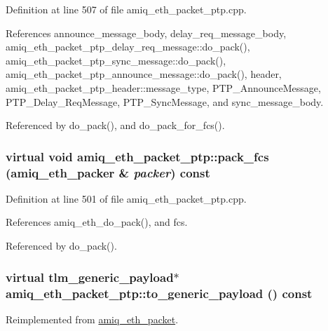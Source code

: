 Definition at line 507 of file amiq\_\-eth\_\-packet\_\-ptp.cpp.

References announce\_\-message\_\-body, delay\_\-req\_\-message\_\-body, amiq\_\-eth\_\-packet\_\-ptp\_\-delay\_\-req\_\-message::do\_\-pack(), amiq\_\-eth\_\-packet\_\-ptp\_\-sync\_\-message::do\_\-pack(), amiq\_\-eth\_\-packet\_\-ptp\_\-announce\_\-message::do\_\-pack(), header, amiq\_\-eth\_\-packet\_\-ptp\_\-header::message\_\-type, PTP\_\-AnnounceMessage, PTP\_\-Delay\_\-ReqMessage, PTP\_\-SyncMessage, and sync\_\-message\_\-body.

Referenced by do\_\-pack(), and do\_\-pack\_\-for\_\-fcs().\hypertarget{classamiq__eth__packet__ptp_ab7bc36daf8f06a4c65e4cbe4c84a04a7}{
\subsubsection[{pack\_\-fcs}]{\setlength{\rightskip}{0pt plus 5cm}virtual void amiq\_\-eth\_\-packet\_\-ptp::pack\_\-fcs ({\bf amiq\_\-eth\_\-packer} \& {\em packer}) const}}
\label{classamiq__eth__packet__ptp_ab7bc36daf8f06a4c65e4cbe4c84a04a7}


Definition at line 501 of file amiq\_\-eth\_\-packet\_\-ptp.cpp.

References amiq\_\-eth\_\-do\_\-pack(), and fcs.

Referenced by do\_\-pack().\hypertarget{classamiq__eth__packet__ptp_a7c1a6b1207ce7e9e604e05cd883bccc0}{
\subsubsection[{to\_\-generic\_\-payload}]{\setlength{\rightskip}{0pt plus 5cm}virtual tlm\_\-generic\_\-payload$\ast$ amiq\_\-eth\_\-packet\_\-ptp::to\_\-generic\_\-payload () const}}
\label{classamiq__eth__packet__ptp_a7c1a6b1207ce7e9e604e05cd883bccc0}


Reimplemented from \hyperlink{classamiq__eth__packet_a6dd92751d8172eeaa347d71bb415b0d5}{amiq\_\-eth\_\-packet}.

